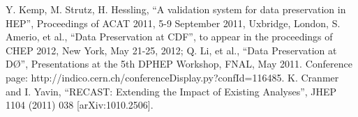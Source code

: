 \begin{thebibliography}{99}
 Y. Kemp, M. Strutz, H. Hessling, “A validation system for data preservation in HEP”, Proceedings of ACAT 2011, 5-9 September 2011, Uxbridge, London, 
 S. Amerio, et al., “Data Preservation at CDF”, to appear in the proceedings of CHEP 2012, New York, May 21-25, 2012; Q. Li, et al., “Data Preservation at DØ”, Presentations at the 5th DPHEP Workshop, FNAL, May 2011. Conference page: http://indico.cern.ch/conferenceDisplay.py?confId=116485.
 K. Cranmer and I. Yavin, “RECAST: Extending the Impact of Existing Analyses”, JHEP 1104 (2011) 038 [arXiv:1010.2506].



\end{thebibliography}


